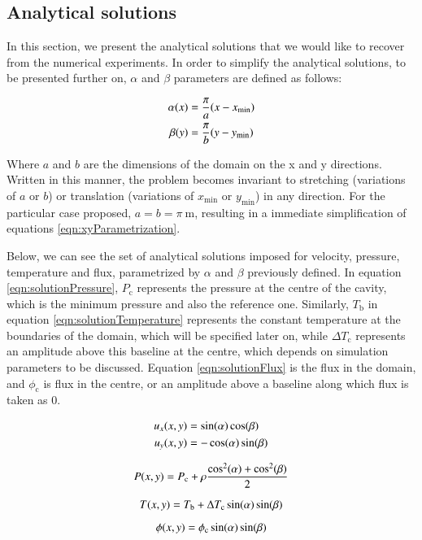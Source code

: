 \subsection{Analytical solutions}

In this section, we present the analytical solutions that we would like to recover from the numerical experiments.
In order to simplify the analytical solutions, to be presented further on, $ \alpha $ and $ \beta $ parameters are defined as follows:

\begin{equation}
    \xyParametrization
\end{equation}

Where $ a $ and $ b $ are the dimensions of the domain on the x and y directions.
Written in this manner, the problem becomes invariant to stretching (variations of $ a $ or $ b $) or translation (variations of $ x_{\text{min}} $ or $ y_{\text{min}} $) in any direction.
For the particular case proposed, $ a = b = \pi \ \text{m} $, resulting in a immediate simplification of equations \ref{eqn:xyParametrization}.

Below, we can see the set of analytical solutions imposed for velocity, pressure, temperature and flux, parametrized by $ \alpha $ and $ \beta $ previously defined.
In equation \ref{eqn:solutionPressure}, $ P_{\text{c}} $ represents the pressure at the centre of the cavity, which is the minimum pressure and also the reference one.
Similarly, $ T_{\text{b}} $ in equation \ref{eqn:solutionTemperature} represents the constant temperature at the boundaries of the domain, which will be specified later on, while $ \Delta T_{\text{c}} $ represents an amplitude above this baseline at the centre, which depends on simulation parameters to be discussed.
Equation \ref{eqn:solutionFlux} is the flux in the domain, and $ \phi_{\text{c}} $ is flux in the centre, or an amplitude above a baseline along which flux is taken as 0.

\begin{equation}
    \solutionVelocity
\end{equation}

\begin{equation}
    \solutionPressure
\end{equation}

\begin{equation}
    \solutionTemperature
\end{equation}

\begin{equation}
    \solutionFlux
\end{equation}

